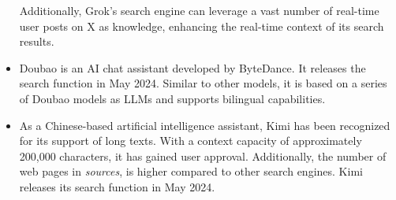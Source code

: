 \begin{itemize}[leftmargin=*]
    Additionally, Grok's search engine can leverage a vast number of real-time user posts on X as knowledge, enhancing the real-time context of its search results.
    \item {} Doubao is an AI chat assistant developed by ByteDance. It releases the search function in May 2024.
    Similar to other models, it is based on a series of Doubao models as LLMs and supports bilingual capabilities.
    \item {} As a Chinese-based artificial intelligence assistant, Kimi has been recognized for its support of long texts.
    With a context capacity of approximately 200,000 characters, it has gained user approval. Additionally, the number of web pages in \textit{sources}, is higher compared to other search engines.
    Kimi releases its search function in May 2024.
\end{itemize}